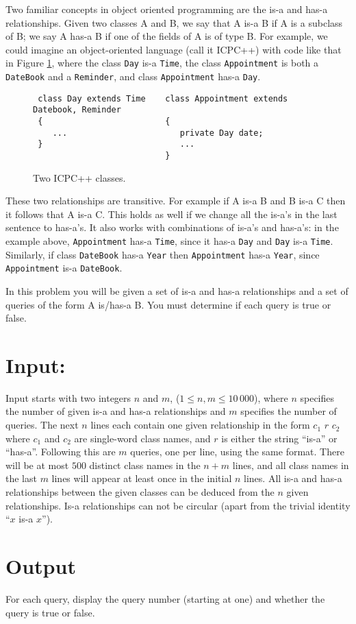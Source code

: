 Two familiar concepts in object oriented programming are the is-a and has-a
relationships. Given two classes A and B, we say that A is-a B if A is a
subclass of B; we say A has-a B if one of the fields of A is of type B.  For
example, we could imagine an object-oriented language (call it ICPC++) with code
like that in Figure \ref{isa_1}, where the class {\tt Day} is-a {\tt Time}, the
class {\tt Appointment} is both a {\tt DateBook} and a {\tt Reminder}, and class
{\tt Appointment} has-a {\tt Day}.

\begin{figure}[!h]
\centering
\begin{verbatim}
 class Day extends Time    class Appointment extends Datebook, Reminder
 {                         {
    ...                       private Day date;
 }                            ...
                           }
\end{verbatim}
  \vspace{-0.2in}%
  \caption{Two ICPC++ classes.}
  \label{isa_1}
\end{figure}
These two relationships are transitive.  For example if A is-a B and B is-a C
then it follows that A is-a C.  This holds as well if we change all the is-a's
in the last sentence to has-a's.  It also works with combinations of is-a's and
has-a's: in the example above, {\tt Appointment} has-a {\tt Time}, since it
has-a {\tt Day} and {\tt Day} is-a {\tt Time}. Similarly, if class
{\tt DateBook} has-a {\tt Year} then {\tt Appointment} has-a {\tt Year}, since
{\tt Appointment} is-a {\tt DateBook}.

In this problem you will be given a set of is-a and has-a relationships and
a set of queries of the form A is/has-a B.  You must determine if each
query is true or false.

\section*{Input:}
Input starts with two integers $n$ and $m$, ($1 \leq n,m \leq 10\,000$), where
$n$ specifies the number of given is-a and has-a relationships and $m$ specifies
the number of queries.  The next $n$ lines each contain one given relationship
in the form $c_1$ $r$ $c_2$ where $c_1$ and $c_2$ are single-word class names,
and $r$ is either the string ``is-a'' or ``has-a''.  Following this are $m$
queries, one per line, using the same format.  There will be at most $500$
distinct class names in the $n+m$ lines, and all class names in the last $m$
lines will appear at least once in the initial $n$ lines.  All is-a and has-a
relationships between the given classes can be deduced from the $n$ given
relationships.
Is-a relationships can not be circular (apart from the trivial identity
``$x$ is-a $x$'').


\section*{Output}
For each query, display the query number (starting at one) and whether the
query is true or false.

